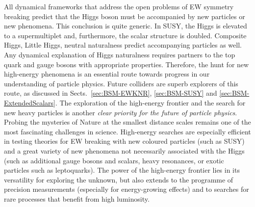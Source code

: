 \documentclass[../report.tex]{subfiles}
\begin{document}
\medskip
{}

\noindent All dynamical frameworks that address the open problems of EW symmetry breaking predict that the Higgs boson must be accompanied by new particles or new phenomena. This conclusion is quite generic. In SUSY, the Higgs is elevated to a supermultiplet and, furthermore, the scalar structure is doubled. Composite Higgs, Little Higgs, neutral naturalness predict accompanying particles as well. Any dynamical explanation of Higgs naturalness requires partners to the top quark and gauge bosons with appropriate properties. Therefore, the hunt for new high-energy phenomena is an essential route towards progress in our understanding of particle physics. Future colliders are superb explorers of this route, as discussed in Sects.~\ref{sec:BSM-EWKNR}, \ref{sec:BSM-SUSY} and \ref{sec:BSM-ExtendedScalars}. The exploration of the high-energy frontier and the search for new heavy particles is another {\it clear priority for the future of particle physics}. Probing the mysteries of Nature at the smallest distance scales remains one of the most fascinating challenges in science. High-energy searches are especially efficient in testing theories for EW breaking with new coloured particles (such as SUSY) and a great variety of new phenomena not necessarily associated with the Higgs (such as additional gauge bosons and scalars, heavy resonances, or exotic particles such as leptoquarks). The power of the high-energy frontier lies in its versatility for exploring the unknown, but also extends to the programme of precision measurements (especially for energy-growing effects) and to searches for rare processes that benefit from high luminosity. 
\end{document}
